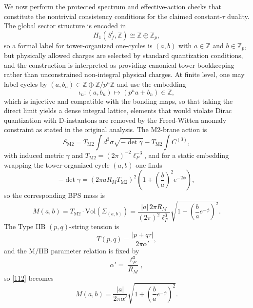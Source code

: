 \documentclass[11pt]{article}
\theoremstyle{remark}
\newcommand{\Z}{\mathbb{Z}}
\begin{document}
We now perform the protected spectrum and effective-action checks that constitute the nontrivial consistency conditions for the claimed constant-\(\tau\) duality. The global sector structure is encoded in
\begin{equation}\label{108}
H_{1}(S_f^{1},\Z)\cong \Z\oplus \Z_{p},
\end{equation}
so a formal label for tower-organized one-cycles is \((a,b)\) with \(a\in \Z\) and \(b\in \Z_{p}\), but physically allowed charges are selected by standard quantization conditions, and the construction is interpreted as providing canonical tower bookkeeping rather than unconstrained non-integral physical charges. At finite level, one may label cycles by \((a,b_{n})\in \Z\oplus \Z/p^{n}\Z\) and use the embedding
\begin{equation}\label{109}
\iota_{n}:(a,b_{n})\longmapsto (p^{n}a+b_{n})\in \Z,
\end{equation}
which is injective and compatible with the bonding maps, so that taking the direct limit yields a dense integral lattice, elements that would violate Dirac quantization with D-instantons are removed by the Freed-Witten anomaly constraint as stated in the original analysis. The M2-brane action is
\begin{equation}\label{110}
S_{\mathrm{M2}}=T_{\mathrm{M2}}\int d^{3}\sigma\sqrt{-\det\gamma}-T_{\mathrm{M2}}\int C^{(3)},
\end{equation}
with induced metric \(\gamma\) and \(T_{\mathrm{M2}}=(2\pi)^{-2}\ell_{P}^{-3}\), and for a static embedding wrapping the tower-organized cycle \((a,b)\) one finds
\begin{equation}\label{111}
-\det\gamma=(2\pi a R_M T_{\mathrm{M2}})^{2}\left(1+\left(\frac{b}{a}\right)^{2}e^{-2\phi}\right),
\end{equation}
so the corresponding BPS mass is
\begin{equation}\label{112}
M(a,b)=T_{\mathrm{M2}}\cdot \mathrm{Vol}(\Sigma_{(a,b)})=\frac{|a|\,2\pi R_M}{(2\pi)^{2}\ell_{P}^{3}}\sqrt{1+\left(\frac{b}{a}e^{-\phi}\right)^{2}}.
\end{equation}
The Type IIB \((p,q)\)-string tension is
\begin{equation}\label{113}
T(p,q)=\frac{|p+q\tau|}{2\pi\alpha'},
\end{equation}
and the M/IIB parameter relation is fixed by
\begin{equation}\label{114}
\alpha'=\frac{\ell_{P}^{3}}{R_M},
\end{equation}
so \eqref{112} becomes
\begin{equation}\label{115}
M(a,b)=\frac{|a|}{2\pi\alpha'}\sqrt{1+\left(\frac{b}{a}e^{-\phi}\right)^{2}}.
\end{equation}
\end{document}
